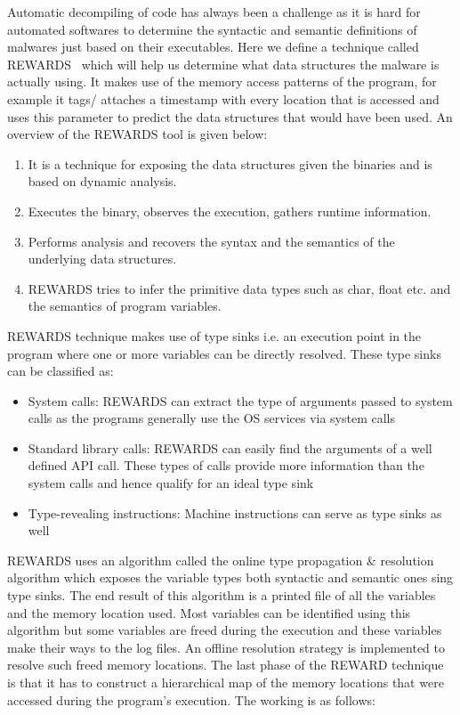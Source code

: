 \documentclass[11pt]{article}
\begin{document}
		Automatic decompiling of code has always been a challenge as it is hard for automated softwares to determine the syntactic and semantic definitions of malwares just based on their executables. Here we define a technique called REWARDS~\cite{lin2010automatic} which will help us determine what data structures the malware is actually using. It makes use of the memory access patterns of the program, for example it tags/ attaches a timestamp with every location that is accessed and uses this parameter to predict the data structures that would have been used. An overview of the REWARDS tool is given below:
		\begin{enumerate}
			\item It is a technique for exposing the data structures given the binaries and is based on dynamic analysis.
			\item Executes the binary, observes the execution, gathers runtime information.
			\item Performs analysis and recovers the syntax and the semantics of the underlying data structures.
			\item REWARDS tries to infer the primitive data types such as char, float etc. and the semantics of program variables.
		\end{enumerate}
		REWARDS technique makes use of type sinks i.e. an execution point in the program where one or more variables can be directly resolved. These type sinks can be classified as:
		\begin{itemize}
			\item System calls: REWARDS can extract the type of arguments passed to system calls as the programs generally use the OS services via system calls
			\item Standard library calls: REWARDS can easily find the arguments of a well defined API call. These types of calls provide more information than the system calls and hence qualify for an ideal type sink
			\item Type-revealing instructions: Machine instructions can serve as type sinks as well
		\end{itemize}
		REWARDS uses an algorithm called the online type propagation \& resolution algorithm which exposes the variable types both syntactic and semantic ones sing type sinks. The end result of this algorithm is a printed file of all the variables and the memory location used. Most variables can be identified using this algorithm but some variables are freed during the execution and these variables make their ways to the log files. An offline resolution strategy is implemented to resolve such freed memory locations. The last phase of the REWARD technique is that it has to construct a hierarchical map of the memory locations that were accessed during the program's execution. The working is as follows:
\end{document}
